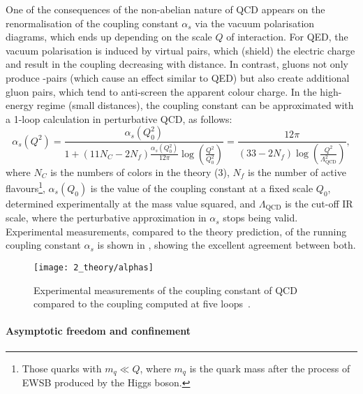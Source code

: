 One of the consequences of the non-abelian nature of \ac{QCD} appears on the renormalisation of the coupling constant \(\alpha_s\) via the vacuum polarisation diagrams, which ends up depending on the scale \(Q\) of interaction. For \ac{QED}, the vacuum polarisation is induced by virtual \ee pairs, which (shield) the electric charge and result in the coupling decreasing with distance. In contrast, gluons not only produce \qqbar-pairs (which cause an effect similar to \ac{QED}) but also create additional gluon pairs, which tend to anti-screen the apparent colour charge. In the high-energy regime (small distances), the coupling constant can be approximated with a 1-loop calculation in perturbative \ac{QCD}, as follows:
\begin{equation}
    \label{eq:theory:sm:mathematical:qcd:alphas}
    \alpha_s\left(Q^2\right) = 
    \frac{
        \alpha_s\left(Q^2_0\right)
    }{
        1 + \left(11 N_C - 2 N_f\right) \frac{\alpha_s\left(Q_0^2\right)}{12\pi} \log \left(\frac{Q^2}{Q_0^2}\right)
    }
    =
    \frac{
        12\pi
    }{
        \left(33 - 2 N_f\right)  \log \left(\frac{Q^2}{\Lambda_{\text{QCD}}^2}\right)
    },
\end{equation}
where \(N_C\) is the numbers of colors in the theory (3), \(N_f\) is the number of active flavours\footnote{Those quarks with \(m_q \ll Q\), where \(m_q\) is the quark mass after the process of \ac{EWSB} produced by the Higgs boson.}, \(\alpha_s\left(Q_0\right)\) is the value of the coupling constant at a fixed scale \(Q_0\), determined experimentally at the \Zboson mass value squared, and \(\Lambda_{\text{QCD}}\) is the cut-off \ac{IR} scale, where the perturbative approximation in \(\alpha_s\) stops being valid. Experimental measurements, compared to the theory prediction, of the running coupling constant \(\alpha_s\) is shown in \Fig{\ref{fig:theory:sm:mathematical:qcd:alphas}}, showing the excellent agreement between both.

\begin{figure}[ht!]
    \centering
    \texttt{[image: 2\_theory/alphas]}
    \caption{Experimental measurements of the coupling constant of \ac{QCD} compared to the coupling computed at five loops~\cite{ParticleDataGroup2024}.}
    \label{fig:theory:sm:mathematical:qcd:alphas}
\end{figure}


\paragraph{Asymptotic freedom and confinement}

